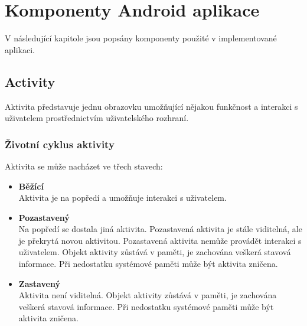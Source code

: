 \documentclass{diplomka}
\begin{document}

\section{Komponenty Android aplikace}
\label{sec:components}
V následující kapitole jsou popsány komponenty použité v implementované aplikaci.
\subsection{Activity}
Aktivita představuje jednu obrazovku umožňující nějakou funkčnost a interakci s uživatelem prostřednictvím uživatelského rozhraní. 

\subsubsection*{Životní cyklus aktivity}
Aktivita se může nacházet ve třech stavech:

\begin{itemize}[]
\item \textbf{Běžící}\\
Aktivita je na popředí a umožňuje interakci s uživatelem.
\item \textbf{Pozastavený}\\
Na popředí se dostala jiná aktivita. Pozastavená aktivita je stále viditelná, ale je překrytá novou aktivitou. Pozastavená aktivita nemůže provádět interakci s uživatelem. Objekt aktivity zůstává v paměti, je zachována veškerá stavová informace. Při nedostatku systémové paměti může být aktivita zničena.
\item \textbf{Zastavený}\\
Aktivita není viditelná. Objekt aktivity zůstává v paměti, je zachována veškerá stavová informace. Při nedostatku systémové paměti může být aktivita zničena.
\end{itemize}
\end{document}
